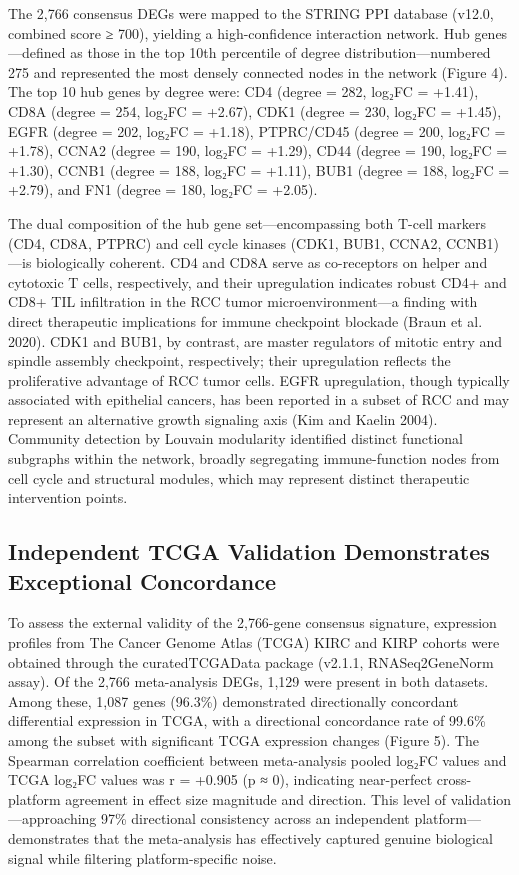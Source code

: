 \documentclass[
  12pt,
]{article}
\begin{document}
The 2,766 consensus DEGs were mapped to the STRING PPI database (v12.0,
combined score ≥ 700), yielding a high-confidence interaction network.
Hub genes---defined as those in the top 10th percentile of degree
distribution---numbered 275 and represented the most densely connected
nodes in the network (Figure 4). The top 10 hub genes by degree were:
CD4 (degree = 282, log₂FC = +1.41), CD8A (degree = 254, log₂FC = +2.67),
CDK1 (degree = 230, log₂FC = +1.45), EGFR (degree = 202, log₂FC =
+1.18), PTPRC/CD45 (degree = 200, log₂FC = +1.78), CCNA2 (degree = 190,
log₂FC = +1.29), CD44 (degree = 190, log₂FC = +1.30), CCNB1 (degree =
188, log₂FC = +1.11), BUB1 (degree = 188, log₂FC = +2.79), and FN1
(degree = 180, log₂FC = +2.05).

The dual composition of the hub gene set---encompassing both T-cell
markers (CD4, CD8A, PTPRC) and cell cycle kinases (CDK1, BUB1, CCNA2,
CCNB1)---is biologically coherent. CD4 and CD8A serve as co-receptors on
helper and cytotoxic T cells, respectively, and their upregulation
indicates robust CD4+ and CD8+ TIL infiltration in the RCC tumor
microenvironment---a finding with direct therapeutic implications for
immune checkpoint blockade (Braun et al. 2020). CDK1 and BUB1, by
contrast, are master regulators of mitotic entry and spindle assembly
checkpoint, respectively; their upregulation reflects the proliferative
advantage of RCC tumor cells. EGFR upregulation, though typically
associated with epithelial cancers, has been reported in a subset of RCC
and may represent an alternative growth signaling axis (Kim and Kaelin
2004). Community detection by Louvain modularity identified distinct
functional subgraphs within the network, broadly segregating
immune-function nodes from cell cycle and structural modules, which may
represent distinct therapeutic intervention points.

\subsection{Independent TCGA Validation Demonstrates Exceptional
Concordance}\label{independent-tcga-validation-demonstrates-exceptional-concordance}

To assess the external validity of the 2,766-gene consensus signature,
expression profiles from The Cancer Genome Atlas (TCGA) KIRC and KIRP
cohorts were obtained through the curatedTCGAData package (v2.1.1,
RNASeq2GeneNorm assay). Of the 2,766 meta-analysis DEGs, 1,129 were
present in both datasets. Among these, 1,087 genes (96.3\%) demonstrated
directionally concordant differential expression in TCGA, with a
directional concordance rate of 99.6\% among the subset with significant
TCGA expression changes (Figure 5). The Spearman correlation coefficient
between meta-analysis pooled log₂FC values and TCGA log₂FC values was r
= +0.905 (p ≈ 0), indicating near-perfect cross-platform agreement in
effect size magnitude and direction. This level of
validation---approaching 97\% directional consistency across an
independent platform---demonstrates that the meta-analysis has
effectively captured genuine biological signal while filtering
platform-specific noise.
\end{document}
